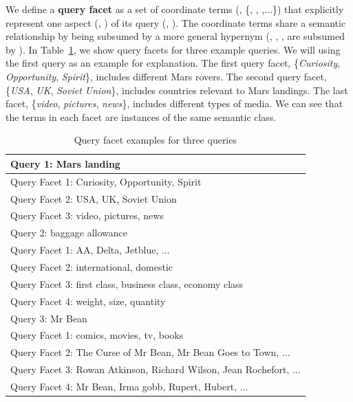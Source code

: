 We define a \textbf{query facet} as a set of coordinate terms (\eg, \{, , ,...\}) that explicitly represent one aspect (\eg, ) of its query (\eg, ). The coordinate terms share a semantic relationship by being subsumed by a more general hypernym (\eg, , ,  are subsumed by ). 
In Table~\ref{tab:facet-facetexample}, we show query facets for three example queries. We will using the first query  as an example for explanation. The first query facet, \{\textit{Curiosity}, \textit{Opportunity}, \textit{Spirit}\}, includes different Mars rovers. The second query facet, \{\textit{USA}, \textit{UK}, \textit{Soviet Union}\}, includes countries relevant to Mars landings. The last facet, \{\textit{video}, \textit{pictures}, \textit{news}\}, includes different types of media. We can see that the terms in each facet are instances of the same semantic class.
\begin{table}[H]
\centering
\caption{Query facet examples for three queries}
\label{tab:facet-facetexample}
\begin{tabular}{|l|} \hline
Query 1: Mars landing \\\hline
Query Facet 1: Curiosity, Opportunity, Spirit \\
Query Facet 2: USA, UK, Soviet Union \\
Query Facet 3: video, pictures, news \\\hhline{|=|}
Query 2: baggage allowance \\\hline
Query Facet 1: AA, Delta, Jetblue,  ... \\
Query Facet 2: international, domestic \\
Query Facet 3: first class, business class, economy class \\
Query Facet 4: weight, size, quantity \\\hhline{|=|}
Query 3: Mr Bean \\\hline
Query Facet 1: comics, movies, tv, books \\
Query Facet 2: The Curse of Mr Bean, Mr Bean Goes to Town, ...\\
Query Facet 3: Rowan Atkinson, Richard Wilson, Jean Rochefort,  ...\\ 
Query Facet 4: Mr Bean, Irma gobb, Rupert, Hubert, ...\\\hline
\end{tabular}
\end{table}


